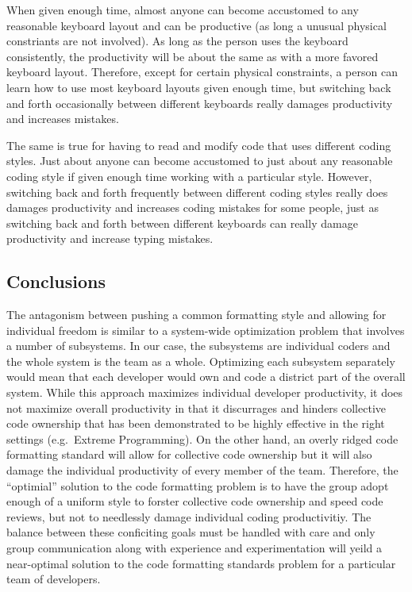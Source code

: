 When given enough time, almost anyone can become accustomed to any reasonable
keyboard layout and can be productive (as long a unusual physical constriants
are not involved).  As long as the person uses the keyboard consistently, the
productivity will be about the same as with a more favored keyboard layout.
Therefore, except for certain physical constraints, a person can learn how to
use most keyboard layouts given enough time, but switching back and forth
occasionally between different keyboards really damages productivity and
increases mistakes.

The same is true for having to read and modify code that uses different coding
styles.  Just about anyone can become accustomed to just about any reasonable
coding style if given enough time working with a particular style.  However,
switching back and forth frequently between different coding styles really
does damages productivity and increases coding mistakes for some people, just
as switching back and forth between different keyboards can really damage
productivity and increase typing mistakes.


%
\subsection{Conclusions}
%

The antagonism between pushing a common formatting style and allowing for
individual freedom is similar to a system-wide optimization problem that
involves a number of subsystems.  In our case, the subsystems are individual
coders and the whole system is the team as a whole.  Optimizing each subsystem
separately would mean that each developer would own and code a district part
of the overall system.  While this approach maximizes individual developer
productivity, it does not maximize overall productivity in that it discurrages
and hinders collective code ownership that has been demonstrated to be highly
effective in the right settings (e.g.\ Extreme Programming).  On the other
hand, an overly ridged code formatting standard will allow for collective code
ownership but it will also damage the individual productivity of every member
of the team.  Therefore, the ``optimial'' solution to the code formatting
problem is to have the group adopt enough of a uniform style to forster
collective code ownership and speed code reviews, but not to needlessly damage
individual coding productivitiy.  The balance between these conficiting goals
must be handled with care and only group communication along with experience
and experimentation will yeild a near-optimal solution to the code formatting
standards problem for a particular team of developers.

